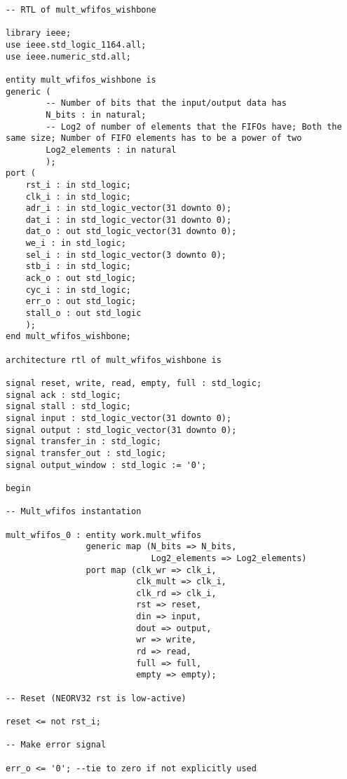 \begin{code}
\begin{verbatim}
-- RTL of mult_wfifos_wishbone

library ieee;
use ieee.std_logic_1164.all;
use ieee.numeric_std.all;

entity mult_wfifos_wishbone is
generic (  
        -- Number of bits that the input/output data has
        N_bits : in natural;
        -- Log2 of number of elements that the FIFOs have; Both the same size; Number of FIFO elements has to be a power of two
        Log2_elements : in natural
        );
port (
    rst_i : in std_logic;
    clk_i : in std_logic;
    adr_i : in std_logic_vector(31 downto 0);
    dat_i : in std_logic_vector(31 downto 0);
    dat_o : out std_logic_vector(31 downto 0);
    we_i : in std_logic;
    sel_i : in std_logic_vector(3 downto 0);
    stb_i : in std_logic;
    ack_o : out std_logic;
    cyc_i : in std_logic;
    err_o : out std_logic;
    stall_o : out std_logic
    );
end mult_wfifos_wishbone;

architecture rtl of mult_wfifos_wishbone is

signal reset, write, read, empty, full : std_logic;
signal ack : std_logic;
signal stall : std_logic;
signal input : std_logic_vector(31 downto 0);
signal output : std_logic_vector(31 downto 0);
signal transfer_in : std_logic;
signal transfer_out : std_logic;
signal output_window : std_logic := '0';

begin

-- Mult_wfifos instantation

mult_wfifos_0 : entity work.mult_wfifos
                generic map (N_bits => N_bits,
                             Log2_elements => Log2_elements)
                port map (clk_wr => clk_i,
                          clk_mult => clk_i,
                          clk_rd => clk_i,
                          rst => reset,
                          din => input,
                          dout => output,
                          wr => write,
                          rd => read,
                          full => full,
                          empty => empty);

-- Reset (NEORV32 rst is low-active)

reset <= not rst_i;

-- Make error signal

err_o <= '0'; --tie to zero if not explicitly used


\end{verbatim}
\end{code}
